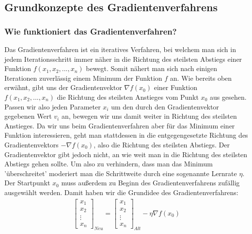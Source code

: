 \subsection{Grundkonzepte des Gradientenverfahrens}\label{subsec:gradientenverfahren:grundkonzepte}

\subsubsection{Wie funktioniert das Gradientenverfahren?}\label{subsec:gradientenverfahren:wie_funktioniert}
  Das Gradientenverfahren ist ein iteratives Verfahren, bei welchem man sich in jedem Iterationsschritt immer näher in die Richtung des
  steilsten Abstiegs einer Funktion $f(x_{1}, x_{2}, ... , x_{n})$ bewegt. Somit nähert man sich nach einigen Iterationen zuverlässig einem Minimum der Funktion $f$ an.
  \bigbreak\noindent
  Wie bereits oben erwähnt, gibt uns der Gradientenvektor $\nabla f(x_{0})$ einer Funktion $f(x_{1}, x_{2}, ... , x_{n})$ die Richtung des steilsten Anstieges vom Punkt $x_0$ aus gesehen.
  Passen wir also jeden Parameter $x_{i}$ um den durch den Gradientenvektor gegebenen Wert $v_{i}$ an, bewegen wir uns damit weiter in Richtung des steilsten Anstieges. 
  Da wir uns beim Gradientenverfahren aber für das Minimum einer Funktion interessieren, geht man stattdessen in die entgegengesetzte Richtung
  des Gradientenvektors $-\nabla f(x_{0})$, also die Richtung des steilsten Abstiegs. Der Gradientenvektor gibt jedoch nicht, an wie weit man in die Richtung des steilsten 
  Abstiegs gehen sollte. Um also zu verhindern, dass man das Minimum 'überschreitet' moderiert man die Schrittweite durch eine sogenannte Lernrate $\eta$.
  Der Startpunkt $x_{0}$ muss außerdem zu Beginn des Gradientenverfahrens zufällig ausgewählt werden.
  Damit haben wir die Grundidee des Gradientenverfahrens: 
  \begin{align*}
    \begin{bmatrix}
          x_{1}\\
          x_{2}\\
          \vdots \\
          x_{n}
         \end{bmatrix}_{Neu} = \begin{bmatrix}
          x_{1}\\
          x_{2}\\
          \vdots \\
          x_{n}
         \end{bmatrix}_{Alt} - \eta \nabla f(x_{0})
  \end{align*}

